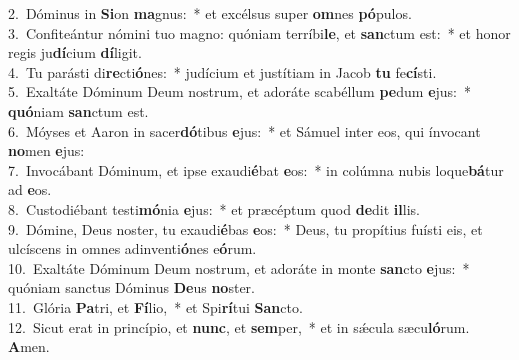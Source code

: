 {2.~}Dóminus in \textbf{Si}on \textbf{ma}gnus:~* et excélsus super \textbf{om}nes \textbf{pó}pulos.\\
{3.~}Confiteántur nómini tuo magno: quóniam terríbi\textbf{le}, et \textbf{san}ctum est:~* et honor regis ju\textbf{dí}cium \textbf{dí}ligit.\\
{4.~}Tu parásti di\textbf{re}cti\textbf{ó}nes:~* judícium et justítiam in Jacob \textbf{tu} fe\textbf{cí}sti.\\
{5.~}Exaltáte Dóminum Deum nostrum, et adoráte scabéllum \textbf{pe}dum \textbf{e}jus:~* \textbf{quó}niam \textbf{san}ctum est.\\
{6.~}Móyses et Aaron in sacer\textbf{dó}tibus \textbf{e}jus:~* et Sámuel inter eos, qui ínvocant \textbf{no}men \textbf{e}jus:\\
{7.~}Invocábant Dóminum, et ipse exaudi\textbf{é}bat \textbf{e}os:~* in colúmna nubis loque\textbf{bá}tur ad \textbf{e}os.\\
{8.~}Custodiébant testi\textbf{mó}nia \textbf{e}jus:~* et præcéptum quod \textbf{de}dit \textbf{il}lis.\\
{9.~}Dómine, Deus noster, tu exaudi\textbf{é}bas \textbf{e}os:~* Deus, tu propítius fuísti eis, et ulcíscens in omnes adinventi\textbf{ó}nes e\textbf{ó}rum.\\
{10.~}Exaltáte Dóminum Deum nostrum, et adoráte in monte \textbf{san}cto \textbf{e}jus:~* quóniam sanctus Dóminus \textbf{De}us \textbf{no}ster.\\
{11.~}Glória \textbf{Pa}tri, et \textbf{Fí}lio,~* et Spi\textbf{rí}tui \textbf{San}cto.\\
{12.~}Sicut erat in princípio, et \textbf{nunc}, et \textbf{sem}per,~* et in sǽcula sæcu\textbf{ló}rum. \textbf{A}men.\\
